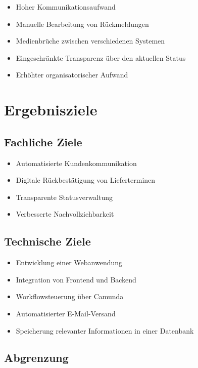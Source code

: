 \documentclass[
12pt,
a4paper
]{article}
\begin{document}
\begin{itemize}
    \item Hoher Kommunikationsaufwand
    \item Manuelle Bearbeitung von Rückmeldungen
    \item Medienbrüche zwischen verschiedenen Systemen
    \item Eingeschränkte Transparenz über den aktuellen Status
    \item Erhöhter organisatorischer Aufwand
\end{itemize}

\section{Ergebnisziele}

\subsection{Fachliche Ziele}

\begin{itemize}
    \item Automatisierte Kundenkommunikation
    \item Digitale Rückbestätigung von Lieferterminen
    \item Transparente Statusverwaltung
    \item Verbesserte Nachvollziehbarkeit
\end{itemize}

\subsection{Technische Ziele}

\begin{itemize}
    \item Entwicklung einer Webanwendung
    \item Integration von Frontend und Backend
    \item Workflowsteuerung über Camunda
    \item Automatisierter E-Mail-Versand
    \item Speicherung relevanter Informationen in einer Datenbank
\end{itemize}

\subsection{Abgrenzung}
\end{document}
